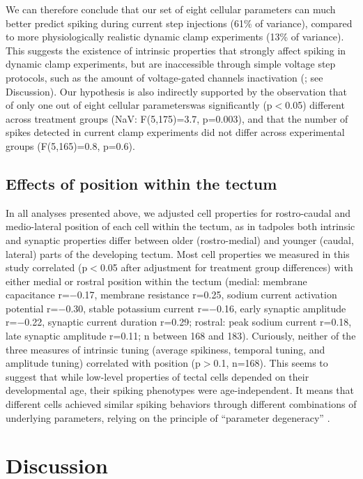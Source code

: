 \documentclass{article}
\begin{document}
We can therefore conclude that our set of eight cellular parameters can much better predict spiking during current step injections (61\% of variance), compared to more physiologically realistic dynamic clamp experiments (13\% of variance). This suggests the existence of intrinsic properties that strongly affect spiking in dynamic clamp experiments, but are inaccessible through simple voltage step protocols, such as the amount of voltage-gated channels inactivation (\citealt{zbili2019axonnav}; see Discussion). Our hypothesis is also indirectly supported by the observation that of only one out of eight cellular parameterswas significantly (p$<$0.05) different across treatment groups (NaV: F(5,175)=3.7, p=0.003), and that the number of spikes detected in current clamp experiments did not differ across experimental groups (F(5,165)=0.8, p=0.6). 

\subsection*{Effects of position within the tectum}

In all analyses presented above, we adjusted cell properties for rostro-caudal and medio-lateral position of each cell within the tectum, as in tadpoles both intrinsic \citep{hamodi2014} and synaptic properties \citep{wu1996,khakhalin2012} differ between older (rostro-medial) and younger (caudal, lateral) parts of the developing tectum. Most cell properties we measured in this study correlated (p$<$0.05 after adjustment for treatment group differences) with either medial or rostral position within the tectum (medial: membrane capacitance r=$-$0.17, membrane resistance r=0.25, sodium current activation potential r=$-$0.30, stable potassium current r=$-$0.16, early synaptic amplitude r=$-$0.22, synaptic current duration r=0.29; rostral: peak sodium current r=0.18, late synaptic amplitude r=0.11; n between 168 and 183). Curiously, neither of the three measures of intrinsic tuning (average spikiness, temporal tuning, and amplitude tuning) correlated with position (p$>$0.1, n=168). This seems to suggest that while low-level properties of tectal cells depended on their developmental age, their spiking phenotypes were age-independent. It means that different cells achieved similar spiking behaviors through different combinations of underlying parameters, relying on the principle of “parameter degeneracy” \citep{prinz2004degeneracy,drion2015}.


\section*{Discussion}
\end{document}
